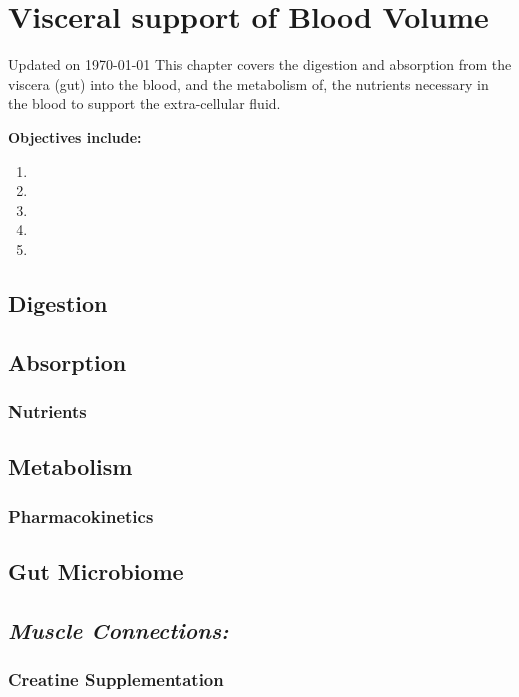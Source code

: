 \chapter{Visceral support of Blood Volume}\label{chp:blood_nutrients}
Updated on \today
\minitoc
This chapter covers the digestion and absorption from the viscera (gut) into the blood, and the metabolism of, the nutrients necessary in the blood to support the extra-cellular fluid. 

\vspace{5mm}

\textbf{Objectives include:}
\begin{enumerate}
    \item
    \item
    \item
    \item
    \item
\end{enumerate}

\section{Digestion}

\section{Absorption}

\subsection{Nutrients}


\section{Metabolism}
\subsection{Pharmacokinetics}


\section{Gut Microbiome}



\section{\textit{Muscle Connections:}}

\subsection{Creatine Supplementation}

\printbibliography[heading=subbibintoc]
